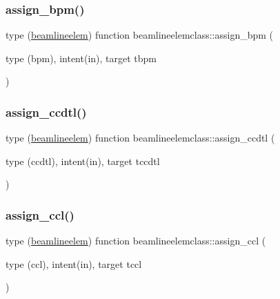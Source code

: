 \subsubsection{\texorpdfstring{assign\_bpm()}{assign\_bpm()}}
{\footnotesize\ttfamily type (\mbox{\hyperlink{namespacebeamlineelemclass_structbeamlineelemclass_1_1beamlineelem}{beamlineelem}}) function beamlineelemclass\+::assign\+\_\+bpm (\begin{DoxyParamCaption}\item[{type (bpm), intent(in), target}]{tbpm }\end{DoxyParamCaption})}

\mbox{\label{namespacebeamlineelemclass_a729afda498a0fcdb5c6625258a745a94}} 
\subsubsection{\texorpdfstring{assign\_ccdtl()}{assign\_ccdtl()}}
{\footnotesize\ttfamily type (\mbox{\hyperlink{namespacebeamlineelemclass_structbeamlineelemclass_1_1beamlineelem}{beamlineelem}}) function beamlineelemclass\+::assign\+\_\+ccdtl (\begin{DoxyParamCaption}\item[{type (ccdtl), intent(in), target}]{tccdtl }\end{DoxyParamCaption})}

\mbox{\label{namespacebeamlineelemclass_ac9b767ca614ed15fb347d385e982ef0d}} 
\subsubsection{\texorpdfstring{assign\_ccl()}{assign\_ccl()}}
{\footnotesize\ttfamily type (\mbox{\hyperlink{namespacebeamlineelemclass_structbeamlineelemclass_1_1beamlineelem}{beamlineelem}}) function beamlineelemclass\+::assign\+\_\+ccl (\begin{DoxyParamCaption}\item[{type (ccl), intent(in), target}]{tccl }\end{DoxyParamCaption})}

\mbox{\label{namespacebeamlineelemclass_ab5db1ddb5dbca2a72ab8efde22f2f90d}} 
